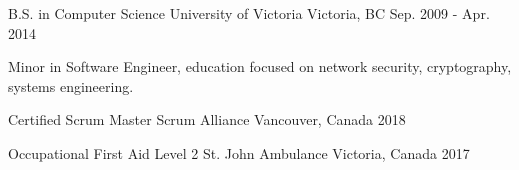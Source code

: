 

\begin{cventries}

  \cventry
    {B.S. in Computer Science} %
    {University of Victoria} %
    {Victoria, BC} %
    {Sep. 2009 - Apr. 2014} %
    {
      \begin{cvitems} %
        \item {Minor in Software Engineer, education focused on network security, cryptography, systems engineering.}
      \end{cvitems}
    }

  \cventry
    {Certified Scrum Master} %
    {Scrum Alliance} %
    {Vancouver, Canada} %
    {2018} %
    {
      \begin{cvitems} %
      \end{cvitems}
    }

  \cventry
    {Occupational First Aid Level 2} %
    {St. John Ambulance} %
    {Victoria, Canada} %
    {2017} %
    {}
\end{cventries}
